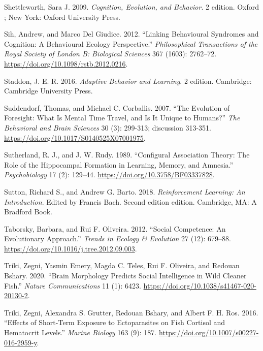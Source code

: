 \documentclass[
  12pt,
]{article}
\newlength{\cslhangindent}
\newlength{\cslentryspacingunit} %
\newenvironment{CSLReferences}[2] %
 {%
  \setlength{\parindent}{0pt}
  \ifodd #1
  \let\oldpar\par
  \def\par{\hangindent=\cslhangindent\oldpar}
  \fi
  \setlength{\parskip}{#2\cslentryspacingunit}
 }%
 {}
\begin{document}
\begin{CSLReferences}{1}{0}
\leavevmode{}%
Shettleworth, Sara J. 2009. \emph{Cognition, {Evolution}, and
{Behavior}}. 2 edition. Oxford ; New York: Oxford University Press.

\leavevmode{}%
Sih, Andrew, and Marco Del Giudice. 2012. {``Linking Behavioural
Syndromes and Cognition: A Behavioural Ecology Perspective.''}
\emph{Philosophical Transactions of the Royal Society of London B:
Biological Sciences} 367 (1603): 2762--72.
\url{https://doi.org/10.1098/rstb.2012.0216}.

\leavevmode{}%
Staddon, J. E. R. 2016. \emph{Adaptive {Behavior} and {Learning}}. 2
edition. Cambridge: Cambridge University Press.

\leavevmode{}%
Suddendorf, Thomas, and Michael C. Corballis. 2007. {``The Evolution of
Foresight: {What} Is Mental Time Travel, and Is It Unique to Humans?''}
\emph{The Behavioral and Brain Sciences} 30 (3): 299-313; discussion
313-351. \url{https://doi.org/10.1017/S0140525X07001975}.

\leavevmode{}%
Sutherland, R. J., and J. W. Rudy. 1989. {``Configural Association
Theory: {The} Role of the Hippocampal Formation in Learning, Memory, and
Amnesia.''} \emph{Psychobiology} 17 (2): 129--44.
\url{https://doi.org/10.3758/BF03337828}.

\leavevmode{}%
Sutton, Richard S., and Andrew G. Barto. 2018. \emph{Reinforcement
{Learning}: {An} {Introduction}}. Edited by Francis Bach. Second edition
edition. Cambridge, MA: A Bradford Book.

\leavevmode{}%
Taborsky, Barbara, and Rui F. Oliveira. 2012. {``Social Competence: An
Evolutionary Approach.''} \emph{Trends in Ecology \& Evolution} 27 (12):
679--88. \url{https://doi.org/10.1016/j.tree.2012.09.003}.

\leavevmode{}%
Triki, Zegni, Yasmin Emery, Magda C. Teles, Rui F. Oliveira, and Redouan
Bshary. 2020. {``Brain Morphology Predicts Social Intelligence in Wild
Cleaner Fish.''} \emph{Nature Communications} 11 (1): 6423.
\url{https://doi.org/10.1038/s41467-020-20130-2}.

\leavevmode{}%
Triki, Zegni, Alexandra S. Grutter, Redouan Bshary, and Albert F. H.
Ros. 2016. {``Effects of Short-Term Exposure to Ectoparasites on Fish
Cortisol and Hematocrit Levels.''} \emph{Marine Biology} 163 (9): 187.
\url{https://doi.org/10.1007/s00227-016-2959-y}.


\end{CSLReferences}
\end{document}
